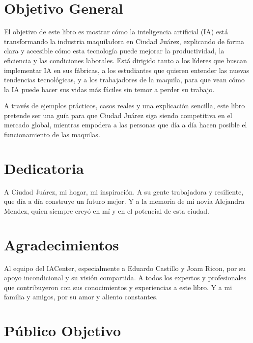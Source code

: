\documentclass[
  10pt,
  letterpaper,
]{book}
\begin{document}
\section*{Objetivo General}\label{objetivo-general}


El objetivo de este libro es mostrar cómo la inteligencia artificial
(IA) está transformando la industria maquiladora en Ciudad Juárez,
explicando de forma clara y accesible cómo esta tecnología puede mejorar
la productividad, la eficiencia y las condiciones laborales. Está
dirigido tanto a los líderes que buscan implementar IA en sus fábricas,
a los estudiantes que quieren entender las nuevas tendencias
tecnológicas, y a los trabajadores de la maquila, para que vean cómo la
IA puede hacer sus vidas más fáciles sin temor a perder su trabajo.

A través de ejemplos prácticos, casos reales y una explicación sencilla,
este libro pretende ser una guía para que Ciudad Juárez siga siendo
competitiva en el mercado global, mientras empodera a las personas que
día a día hacen posible el funcionamiento de las maquilas.

\section*{Dedicatoria}\label{dedicatoria}


A Ciudad Juárez, mi hogar, mi inspiración. A su gente trabajadora y
resiliente, que día a día construye un futuro mejor. Y a la memoria de
mi novia Alejandra Mendez, quien siempre creyó en mí y en el potencial
de esta ciudad.

\section*{Agradecimientos}\label{agradecimientos}


Al equipo del IACenter, especialmente a Eduardo Castillo y Joam Ricon,
por su apoyo incondicional y su visión compartida. A todos los expertos
y profesionales que contribuyeron con sus conocimientos y experiencias a
este libro. Y a mi familia y amigos, por su amor y aliento constantes.

\section*{Público Objetivo}\label{puxfablico-objetivo}
\end{document}
